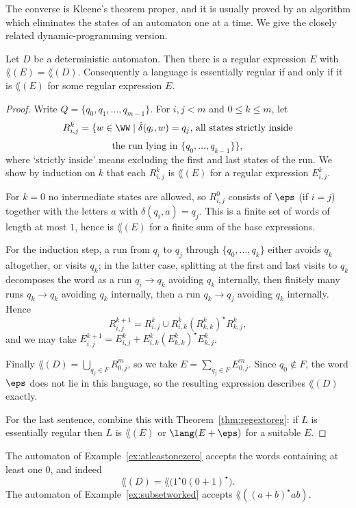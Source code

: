 The converse is Kleene's theorem proper, and it is usually proved by an algorithm which eliminates the states of an automaton one at a time. We give the closely related dynamic-programming version.

\begin{theorem}[Kleene]\label{thm:kleene}
	Let $D$ be a deterministic automaton. Then there is a regular expression $E$ with $\lang(E) = \lang(D)$. Consequently a language is essentially regular if and only if it is $\lang(E)$ for some regular expression $E$.
\end{theorem}

\begin{proof}
	Write $Q = \{q_0, q_1, \dots, q_{m-1}\}$. For $i, j < m$ and $0 \leq k \leq m$, let
	$$R^k_{i,j} = \{w \in \WW \mid \hat\delta(q_i, w) = q_j \text{, all states strictly inside}$$
	$$\text{the run lying in } \{q_0, \dots, q_{k-1}\}\},$$
	where `strictly inside' means excluding the first and last states of the run. We show by induction on $k$ that each $R^k_{i,j}$ is $\lang(E)$ for a regular expression $E^k_{i,j}$.

	For $k = 0$ no intermediate states are allowed, so $R^0_{i,j}$ consists of $\eps$ (if $i = j$) together with the letters $a$ with $\delta(q_i,a) = q_j$. This is a finite set of words of length at most $1$, hence is $\lang(E)$ for a finite sum of the base expressions.

	For the induction step, a run from $q_i$ to $q_j$ through $\{q_0,\dots,q_k\}$ either avoids $q_k$ altogether, or visits $q_k$; in the latter case, splitting at the first and last visits to $q_k$ decomposes the word as a run $q_i \to q_k$ avoiding $q_k$ internally, then finitely many runs $q_k \to q_k$ avoiding $q_k$ internally, then a run $q_k \to q_j$ avoiding $q_k$ internally. Hence
	$$R^{k+1}_{i,j} = R^k_{i,j} \cup R^k_{i,k}\left(R^k_{k,k}\right)^\star R^k_{k,j},$$
	and we may take $E^{k+1}_{i,j} = E^k_{i,j} + E^k_{i,k}(E^k_{k,k})^\star E^k_{k,j}$.

	Finally $\lang(D) = \bigcup_{q_j \in F} R^m_{0,j}$, so we take $E = \sum_{q_j \in F} E^m_{0,j}$. Since $q_0 \notin F$, the word $\eps$ does not lie in this language, so the resulting expression describes $\lang(D)$ exactly.

	For the last sentence, combine this with Theorem~\ref{thm:regextoreg}: if $L$ is essentially regular then $L$ is $\lang(E)$ or $\lang(E + \eps)$ for a suitable $E$.
\end{proof}

\begin{example}
	The automaton of Example~\ref{ex:atleastonezero} accepts the words containing at least one $0$, and indeed
	$$\lang(D) = \lang\big(1^\star 0 (0+1)^\star\big).$$
	The automaton of Example~\ref{ex:subsetworked} accepts $\lang((a+b)^\star ab)$.
\end{example}

